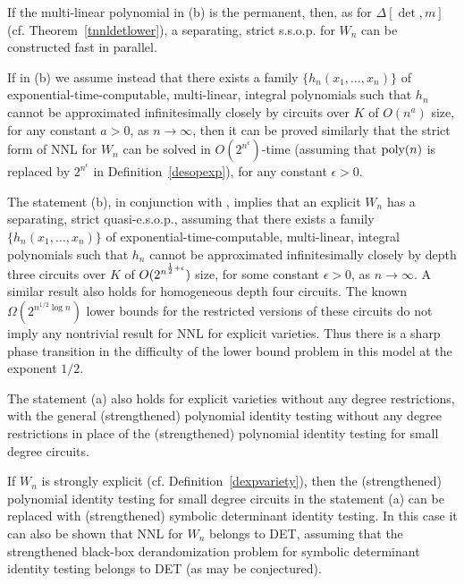 \documentclass[11pt]{article}
\begin{document}
 If the multi-linear polynomial in (b)  is the permanent, then,
as for $\Delta[\det,m]$ (cf. Theorem~\ref{tnnldetlower}),
a separating, strict s.s.o.p. for  $W_n$ can be constructed  fast in parallel.

If in (b)  we assume instead that  there exists a family $\{h_n(x_1,\ldots,x_n)\}$ 
of  exponential-time-computable, multi-linear, integral polynomials such that $h_n$
cannot be  approximated infinitesimally closely by 
 circuits over $K$ of  $O(n^a)$ size, for any constant $a>0$, as
$n\rightarrow \infty$, then  it can be proved similarly that the strict 
form of  NNL for
$W_n$ can be solved in $O(2^{n^\epsilon})$-time
(assuming that ${\mbox {poly}}(n)$ is replaced by $2^{n^\epsilon}$ in 
Definition~\ref{desopexp}), for any constant $\epsilon >0$. 

 The statement  (b), 
in conjunction with \cite{kayalnew}, 
implies that an explicit  $W_n$ has a separating, strict quasi-e.s.o.p.,
assuming that 
there exists a family $\{h_n(x_1,\ldots,x_n)\}$ of 
exponential-time-computable, multi-linear, integral polynomials
such that $h_n$ cannot be approximated infinitesimally closely by  depth three 
circuits over $K$ of $O(2^{n^{{\frac {1} {2}} + \epsilon}})$ size,  for some constant $\epsilon>0$, as
$n \rightarrow \infty$. A similar result also holds for homogeneous depth four 
circuits. The known $\Omega(2^{n^{1/2} \log n})$ lower bounds for the restricted versions
of these  circuits 
\cite{kayalsurvey} do not  imply
any nontrivial result for NNL for explicit varieties. Thus there is a sharp phase transition 
in the difficulty of the lower bound problem in this model  at the exponent $1/2$.


 The statement (a) also holds for 
explicit varieties without any degree restrictions,  with the 
general (strengthened) polynomial identity testing without any degree restrictions in place of the (strengthened) polynomial identity testing for small degree circuits.

 If $W_n$ is strongly explicit (cf. Definition~\ref{dexpvariety}), then the
(strengthened) polynomial identity testing for small degree circuits in the statement (a)
can be replaced with (strengthened) symbolic determinant identity testing. In this case it can also be shown that
NNL for $W_n$ belongs to DET, assuming that the strengthened black-box derandomization problem  for symbolic determinant identity testing belongs to DET (as may be
conjectured).
\end{document}
